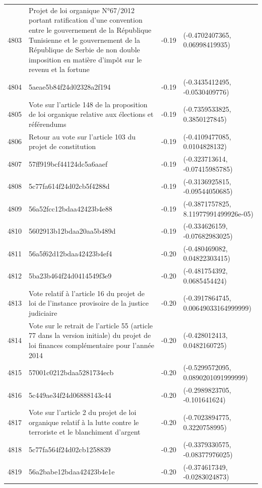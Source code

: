 \begin{table}[ht]
\begin{tabular}{rlrl}
  4803 & Projet de loi organique N°67/2012 portant ratification d'une convention entre le gouvernement de la République Tunisienne et le gouvernement de la République de Serbie de non double imposition en matière d'impôt sur le revenu et la fortune & -0.19 & (-0.4702407365, 0.06998419935) \\ 
  4804 & 5aeae5b84f24d02328a2f194 & -0.19 & (-0.3435412495, -0.0530409776) \\ 
  4805 & Vote sur l'article 148 de la proposition de loi organique relative aux élections et référendums & -0.19 & (-0.7359533825, 0.3850127845) \\ 
  4806 & Retour au vote sur l'article 103 du projet de constitution & -0.19 & (-0.4109477085, 0.0104828132) \\ 
  4807 & 57ff919bcf44124dc5a6aaef & -0.19 & (-0.323713614, -0.07415985785) \\ 
  4808 & 5c77fa614f24d02cb5f4288d & -0.19 & (-0.3136925815, -0.09544050685) \\ 
  4809 & 56a52fcc12bdaa42423b4e88 & -0.19 & (-0.3871757825, 8.11977991499926e-05) \\ 
  4810 & 5602913b12bdaa20aa5b489d & -0.19 & (-0.334626159, -0.07682983025) \\ 
  4811 & 56a5f62d12bdaa42423b4ef4 & -0.20 & (-0.480469082, 0.04822303415) \\ 
  4812 & 5ba23b464f24d0414549f3e9 & -0.20 & (-0.481754392, 0.0685454424) \\ 
  4813 & Vote relatif à l'article 16 du projet de loi de l'instance provisoire de la justice judiciaire & -0.20 & (-0.3917864745, 0.00649033164999999) \\ 
  4814 & Vote sur le retrait de l'article 55 (article 77 dans la version initiale) du projet de loi finances complémentaire pour l'année 2014 & -0.20 & (-0.428012413, 0.0482160725) \\ 
  4815 & 57001c0212bdaa5281734ecb & -0.20 & (-0.5299572095, 0.0890201091999999) \\ 
  4816 & 5c449ae34f24d06888143c44 & -0.20 & (-0.2989823705, -0.101641624) \\ 
  4817 & Vote sur l'article 2 du projet de loi organique relatif à la lutte contre le terroriste et le blanchiment d'argent & -0.20 & (-0.7023894775, 0.3220758995) \\ 
  4818 & 5c77fa564f24d02cb1258839 & -0.20 & (-0.3379330575, -0.08377976025) \\ 
  4819 & 56a2babe12bdaa42423b4e1e & -0.20 & (-0.374617349, -0.0283024873) \\ 

\end{tabular}
\end{table}
